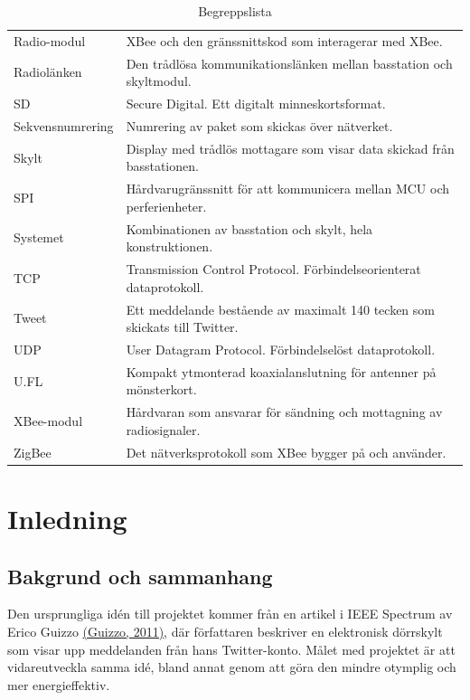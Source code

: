 \documentclass[a4paper,11pt]{article}
\begin{document}
\begin{table}[h!]
\begin{tabular}{|l|l|}
Radio-modul & XBee och den gränssnittskod som interagerar med XBee.\\
Radiolänken & Den trådlösa kommunikationslänken mellan basstation och skyltmodul.\\
SD & Secure Digital. Ett digitalt minneskortsformat.\\
Sekvensnumrering & Numrering av paket som skickas över nätverket.\\
Skylt & Display med trådlös mottagare som visar data skickad från basstationen.\\
SPI & Hårdvarugränssnitt för att kommunicera mellan MCU och perferienheter.\\
Systemet & Kombinationen av basstation och skylt, hela konstruktionen.\\
TCP & Transmission Control Protocol. Förbindelseorienterat dataprotokoll.\\
Tweet & Ett meddelande bestående av maximalt 140 tecken som skickats till Twitter.\\
UDP & User Datagram Protocol. Förbindelselöst dataprotokoll.\\
U.FL & Kompakt ytmonterad koaxialanslutning för antenner på mönsterkort.\\
XBee-modul & Hårdvaran som ansvarar för sändning och mottagning av radiosignaler.\\
ZigBee & Det nätverksprotokoll som XBee bygger på och använder.\\
	\end{tabular}
\caption{Begreppslista}
\label{tab:begreppstable}
\end{table}

\thispagestyle{empty}
\pagebreak

\thispagestyle{empty}
\tableofcontents
\thispagestyle{empty}
\pagebreak

\setcounter{page}{1}
\section{Inledning}

\subsection{Bakgrund och sammanhang}
Den ursprungliga idén till projektet kommer från en artikel i IEEE Spectrum av Erico Guizzo \hyperref[spectrum]{(Guizzo, 2011)}, där författaren beskriver en elektronisk dörrskylt som visar upp meddelanden från hans Twitter-konto. Målet med projektet är att vidareutveckla samma idé, bland annat genom att göra den mindre otymplig och mer energieffektiv. \\
\end{document}
